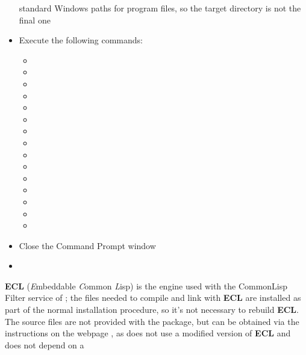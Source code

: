\begin{itemize}
standard Windows paths for program files, so the target directory is not the final one
\item\exSp{}Execute the following commands:
\begin{itemize}
\item {}
\item\exSp{}
\item\exSp{}
\item\exSp{}
\item\exSp{}
\item\exSp{}
\item\exSp{}
\item\exSp{}
\item\exSp{}
\item\exSp{}
\item\exSp{}
\item\exSp{}
\item\exSp{}
\item\exSp{}
\item\exSp{}
\end{itemize}
\item\exSp{}Close the Command Prompt window
\end{itemize}
\tertiaryEnd
{}
\begin{itemize}
\item\TBD
\end{itemize}
\tertiaryEnd
\secondaryEnd
{}
\textbf{ECL} (\textit{E}mbeddable \textit{C}ommon \textit{L}isp) is the
 engine used with the CommonLisp Filter service of \mplusm{}; the
files needed to compile and link with \textbf{ECL} are installed as part of the normal
\mplusm{} installation procedure, so it's not necessary to rebuild \textbf{ECL}.
The source files are not provided with the  package, but can be obtained
via the instructions on the web\longDash{}page
, as
\mplusm{} does not use a modified version of \textbf{ECL} and does not depend on a

